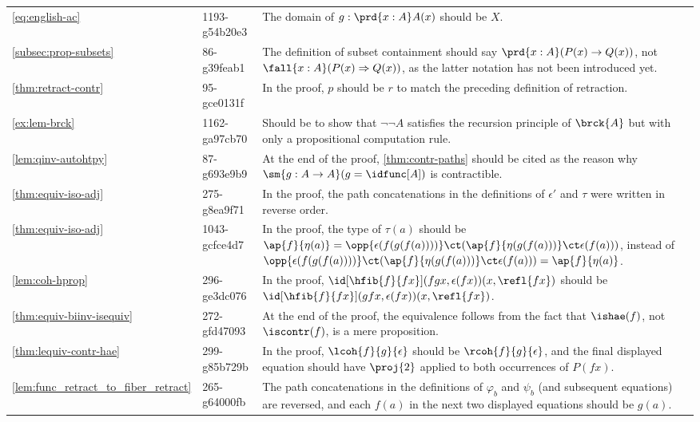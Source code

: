 \documentclass[
%
%
11pt %
]{article}
\begin{document}
\begin{longtable}{llp{10.5cm}}
  \cref{eq:english-ac}
  & 1193-g54b20e3
  & The domain of $g:\prd{x:A} A(x)$ should be $X$.\\
  \cref{subsec:prop-subsets}
  & 86-g39feab1
  & The definition of subset containment should say $\prd{x:A}(P(x)\rightarrow Q(x))$, not $\fall{x:A}(P(x)\Rightarrow Q(x))$, as the latter notation has not been introduced yet.\\
  \cref{thm:retract-contr}
  & 95-gce0131f
  & In the proof, $p$ should be $r$ to match the preceding definition of retraction.\\
  \cref{ex:lem-brck}
  & 1162-ga97cb70
  & Should be to show that $\neg\neg A$ satisfies the recursion principle of $\brck{A}$ but with only a propositional computation rule.\\
  \cref{lem:qinv-autohtpy}
  & 87-g693e9b9
  & At the end of the proof, \cref{thm:contr-paths} should be cited as the reason why $\sm{g:A\to A} (g = \idfunc[A])$ is contractible.\\
  \cref{thm:equiv-iso-adj}
  & 275-g8ea9f71
  & In the proof, the path concatenations in the definitions of $\epsilon'$ and $\tau$ were written in reverse order.\\
  \cref{thm:equiv-iso-adj}
  & 1043-gcfce4d7
  & In the proof, the type of $\tau(a)$ should be $\ap{f}{\eta(a)}=\opp{\epsilon(f(g(f(a))))}\ct (\ap{f}{\eta(g(f(a)))}\ct \epsilon(f(a)))$, instead of $\opp{\epsilon(f(g(f(a))))}\ct (\ap{f}{\eta(g(f(a)))}\ct \epsilon(f(a)))=\ap{f}{\eta(a)}$.\\
  \cref{lem:coh-hprop}
  & 296-ge3dc076
  & In the proof, $\id[\hfib{f}{fx}]{(fgx,\epsilon(fx))}{(x,\refl{fx})}$ should be $\id[\hfib{f}{fx}]{(gfx,\epsilon(fx))}{(x,\refl{fx})}$.\\
  \cref{thm:equiv-biinv-isequiv}
  & 272-gfd47093
  & At the end of the proof, the equivalence follows from the fact that $\ishae(f)$, not $\iscontr(f)$, is a mere proposition. \\
  \cref{thm:lequiv-contr-hae}
  & 299-g85b729b
  & In the proof, $\lcoh{f}{g}{\epsilon}$ should be $\rcoh{f}{g}{\epsilon}$, and the final displayed equation should have $\proj{2}$ applied to both occurrences of $P(fx)$.\\
  \cref{lem:func_retract_to_fiber_retract}
  & 265-g64000fb
  & The path concatenations in the definitions of $\varphi_b$ and $\psi_b$ (and subsequent equations) are reversed, and each $f(a)$ in the next two displayed equations should be $g(a)$.\\

\end{longtable}
\end{document}
